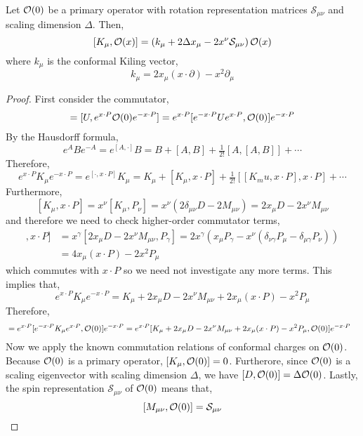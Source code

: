 \documentclass[12pt]{extarticle}
\begin{document}
\begin{theorem}
Let $\mathcal{O}(0)$ be a primary operator with rotation representation matrices $\mathcal{S}_{\mu\nu}$ and scaling dimension $\Delta$. Then,
\[ [K_\mu, \mathcal{O}(x)] = \left(k_\mu + 2 \Delta x_\mu - 2 x^\nu \mathcal{S}_{\mu \nu} \right) \mathcal{O}(x) \]
where $k_\mu$ is the conformal Kiling vector,
\[ k_\mu = 2 x_\mu (x \cdot \partial) - x^2 \partial_\mu \]
\end{theorem} 

\begin{proof}
First consider the commutator,
\begin{align*}
[U, \Op(x)] = [U, e^{x \cdot P} \Op(0) e^{- x \cdot P}] = e^{x \cdot P} [e^{-x \cdot P} U e^{x \cdot P}, \Op(0)] e^{- x \cdot P} 
\end{align*}
By the Hausdorff formula,
\[ e^{A} B e^{-A} = e^{[A, \cdot]} B = B + [A, B] + \tfrac{1}{2!} [A, [A, B]] + \cdots \] 
Therefore,
\[ e^{x \cdot P} K_\mu e^{-x \cdot P} = e^{[\cdot, x \cdot P]} K_\mu = K_\mu + [K_\mu, x \cdot P] + \tfrac{1}{2!} [[K_mu, x \cdot P], x \cdot P] + \cdots  \]
Furthermore,
\[ [K_\mu, x \cdot P] = x^\nu [K_\mu, P_\nu] = x^\nu (2 \delta_{\mu \nu} D - 2 M_{\mu \nu}) = 2 x_\mu D - 2 x^\nu M_{\mu \nu} \]
and therefore we need to check higher-order commutator terms,
\begin{align*}
[[K_\mu, x \cdot P], x \cdot P] & = x^\gamma [2 x_\mu D - 2 x^\nu M_{\mu \nu}, P_\gamma] = 2x^\gamma ( x_\mu P_\gamma - x^\nu (\delta_{\nu \gamma} P_\mu - \delta_{\mu \gamma} P_\nu))
\\
& =  4 x_\mu (x \cdot P) - 2 x^2 P_\mu 
\end{align*}
which commutes with $x \cdot P$ so we need not investigate any more terms. 
This implies that,
\[ e^{x \cdot P} K_\mu e^{-x \cdot P} = K_\mu + 2 x_\mu D - 2 x^\nu M_{\mu \nu} + 2 x_\mu (x \cdot P) - x^2 P_\mu \]
Therefore,
\begin{align*}
[K_\mu, \Op(x)] & = e^{x \cdot P} [ e^{- x \cdot P} K_\mu e^{x \cdot P}, \Op(0)] e^{- x \cdot P} = e^{x \cdot P} [K_\mu + 2 x_\mu D - 2 x^\nu M_{\mu \nu} + 2 x_\mu (x \cdot P) - x^2  P_\mu, \Op(0)] e^{-x \cdot P}
\end{align*}
Now we apply the known commutation relations of conformal charges on $\mathcal{O}(0)$. Because $\mathcal{O}(0)$ is a primary operator, $[K_\mu, \mathcal{O}(0)] = 0$. Furtherore, since $\mathcal{O}(0)$ is a scaling eigenvector with scaling dimension $\Delta$, we have $[D, \mathcal{O}(0)] = \Delta \mathcal{O}(0)$. Lastly, the spin representation $\mathcal{S}_{\mu\nu}$ of $\mathcal{O}(0)$ means that,
\[ [M_{\mu\nu}, \mathcal{O}(0)] = \mathcal{S}_{\mu\nu} \]

\end{proof}
\end{document}
